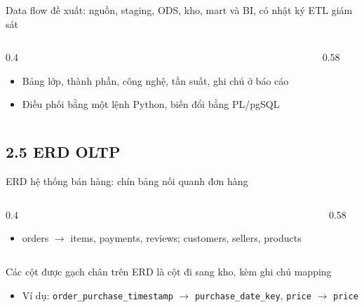 \begin{frame}{Data flow đề xuất: nguồn, staging, ODS, kho, mart và BI, có nhật ký ETL giám sát}
\begin{columns}[T]\begin{column}{0.4\textwidth}
\begin{itemize}
  \item Bảng lớp, thành phần, công nghệ, tần suất, ghi chú ở báo cáo
  \item Điều phối bằng một lệnh Python, biến đổi bằng PL/pgSQL
\end{itemize}
\end{column}\begin{column}{0.58\textwidth}
\begin{center}\end{center}
\end{column}\end{columns}

\end{frame}

\subsection{2.5 ERD OLTP}

\begin{frame}{ERD hệ thống bán hàng: chín bảng nối quanh đơn hàng}
\begin{columns}[T]\begin{column}{0.4\textwidth}
\begin{itemize}
  \item orders $\rightarrow$ items, payments, reviews; customers, sellers, products
\end{itemize}
\end{column}\begin{column}{0.58\textwidth}
\begin{center}\end{center}
\end{column}\end{columns}

\end{frame}

\begin{frame}{Các cột được gạch chân trên ERD là cột đi sang kho, kèm ghi chú mapping}
\begin{itemize}
  \item Ví dụ: \texttt{order\_\allowbreak{}purchase\_\allowbreak{}timestamp} $\rightarrow$ \texttt{purchase\_\allowbreak{}date\_\allowbreak{}key}, \texttt{price} $\rightarrow$ \texttt{price}
\end{itemize}

\end{frame}


